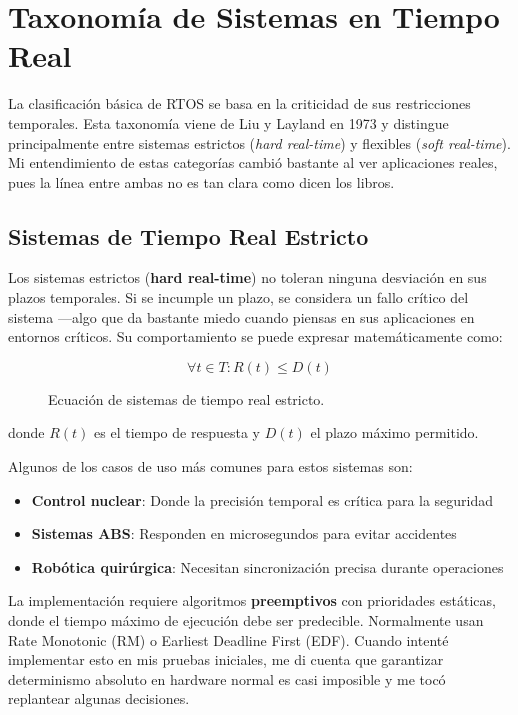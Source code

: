 \newpage
\section{Taxonomía de Sistemas en Tiempo Real}
    La clasificación básica de RTOS se basa en la criticidad de sus restricciones temporales. Esta taxonomía viene de Liu y Layland en 1973 \cite{Siewert_Pratt_2016} y distingue principalmente entre sistemas estrictos (\textit{hard real-time}) y flexibles (\textit{soft real-time}). Mi entendimiento de estas categorías cambió bastante al ver aplicaciones reales, pues la línea entre ambas no es tan clara como dicen los libros.

    \subsection{Sistemas de Tiempo Real Estricto}
        Los sistemas estrictos (\textbf{hard real-time}) no toleran ninguna desviación en sus plazos temporales. Si se incumple un plazo, se considera un fallo crítico del sistema —algo que da bastante miedo cuando piensas en sus aplicaciones en entornos críticos. Su comportamiento se puede expresar matemáticamente como:

        \begin{figure}[h!]
            \centering
            \begin{equation}
                \forall t \in T: R(t) \leq D(t)
            \end{equation}
            \caption{Ecuación de sistemas de tiempo real estricto.}
            \label{fig:hard_real_time_equation}
        \end{figure}

        donde $R(t)$ es el tiempo de respuesta y $D(t)$ el plazo máximo permitido.

        Algunos de los casos de uso más comunes para estos sistemas son:
        \begin{itemize}
            \item \textbf{Control nuclear}: Donde la precisión temporal es crítica para la seguridad
            \item \textbf{Sistemas ABS}: Responden en microsegundos para evitar accidentes
            \item \textbf{Robótica quirúrgica}: Necesitan sincronización precisa durante operaciones
        \end{itemize}

    La implementación requiere algoritmos \textbf{preemptivos} con prioridades estáticas, donde el tiempo máximo de ejecución debe ser predecible. Normalmente usan Rate Monotonic (RM) o Earliest Deadline First (EDF). Cuando intenté implementar esto en mis pruebas iniciales, me di cuenta que garantizar determinismo absoluto en hardware normal es casi imposible y me tocó replantear algunas decisiones.


